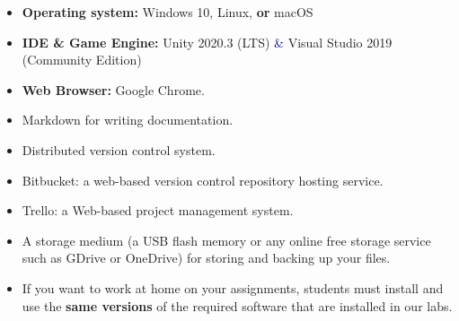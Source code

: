 \documentclass[11pt, a4paper]{article}
\begin{document}
\vspace{.4cm}

\begin{itemize}[itemsep=2pt,parsep=0pt,topsep=2pt,partopsep=2pt]
	\item[\color{darkblue}\faLaptopCode] \textbf{Operating system:} \faWindows {} Windows  10,  \faLinux {} Linux, \textcolor{vanierred}{\textbf{or}} \faApple {} macOS 
	\item[\color{darkblue}\faCode] \textbf{IDE \& Game Engine:} \faUnity Unity \textcolor{vanierred}{2020.3 (LTS)} \textcolor{darkblue}{\&} Visual Studio \textcolor{vanierred}{2019} (Community Edition)
	\item [{\color{darkblue}\faChrome}] \textbf{Web Browser:} Google Chrome.   
	\item[{\color{darkblue} \faWpforms}] Markdown for writing documentation.
	\item[{\color{darkblue} \faGitSquare}] Distributed version control system.
	\item[{\color{darkblue} \faBitbucket}] Bitbucket: a web-based version control repository hosting service.
	\item[{\color{darkblue} \faTrello}] Trello: a Web-based project management system.
	
	\item[\color{darkblue}\faUsb]
	A storage medium (a USB flash memory or any online free storage service such as GDrive or OneDrive) for storing and backing up your files. 
	\item[\color{darkblue}\faInfoCircle]
	If you want to work at home on your assignments, students must install and use the \textbf{same versions} of the required software that are installed in our labs. \\
\end{itemize}   
\end{document}
